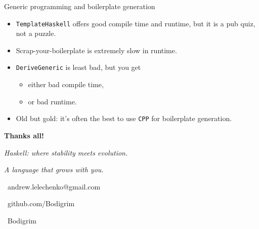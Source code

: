 \documentclass[handout]{beamer}
\begin{document}
\begin{frame}{Generic programming and boilerplate generation}

\begin{itemize}[<+->]\itemsep3ex
  \item {\tt TemplateHaskell} offers good compile time and runtime,
        but it is a pub quiz, not a puzzle.
  \item Scrap-your-boilerplate is extremely slow in runtime.
  \item {\tt DeriveGeneric} is least bad, but you get
        \begin{itemize}
          \item either bad compile time,
          \item or bad runtime.
        \end{itemize}
  \item Old but gold: it's often the best to use {\tt CPP} for boilerplate generation.
\end{itemize}

\end{frame}

\begin{frame}[fragile]

\bigskip


\begin{block}{}
\bigskip
\centerline{\Huge\bf \color{ukraine-blue} Thanks all!}
\bigskip
\end{block}

\bigskip
\bigskip

\centerline{\Large\it
  Haskell: where stability meets evolution.
}
\medskip
\centerline{\Large\it
  A language that grows with you.
}
\bigskip
\bigskip

\centerline{
\faAt\ andrew.lelechenko@gmail.com
}
\medskip
\centerline{
\faGithub\ github.com/Bodigrim
}
\medskip
\centerline{
\faTelegram\ Bodigrim
}

\end{frame}
\end{document}
